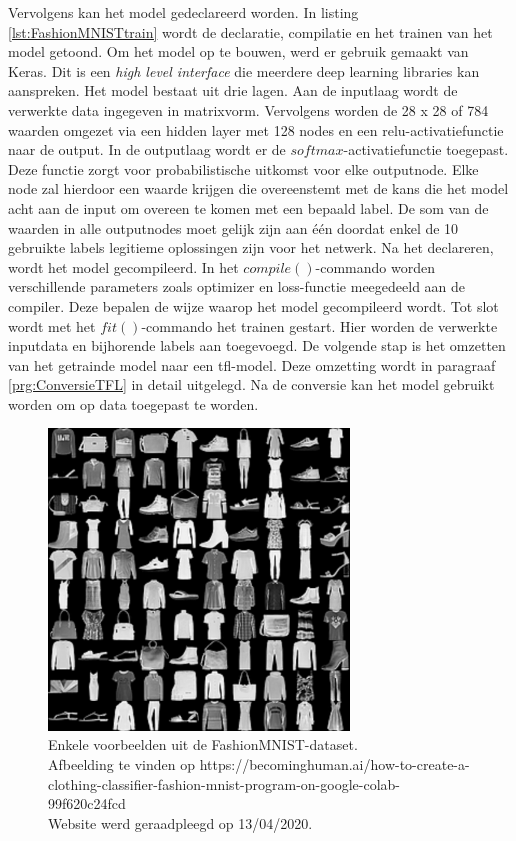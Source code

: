 			Vervolgens kan het model gedeclareerd worden. In listing \ref{lst:FashionMNISTtrain} wordt de declaratie, compilatie en het trainen van het model getoond. Om het model op te bouwen, werd er gebruik gemaakt van Keras. Dit is een \textit{high level interface} die meerdere deep learning libraries kan aanspreken. Het model bestaat uit drie lagen. Aan de inputlaag wordt de verwerkte data ingegeven in matrixvorm. Vervolgens worden de 28 x 28 of 784 waarden omgezet via een hidden layer met 128 nodes en een relu-activatiefunctie naar de output. In de outputlaag wordt er de $softmax$-activatiefunctie toegepast. Deze functie zorgt voor probabilistische uitkomst voor elke outputnode. Elke node zal hierdoor een waarde krijgen die overeenstemt met de kans die het model acht aan de input om overeen te komen met een bepaald label. De som van de waarden in alle outputnodes moet gelijk zijn aan \'e\'en doordat enkel de 10 gebruikte labels legitieme oplossingen zijn voor het netwerk. Na het declareren, wordt het model gecompileerd. In het $compile()$-commando worden verschillende parameters zoals optimizer en loss-functie meegedeeld aan de compiler. Deze bepalen de wijze waarop het model gecompileerd wordt. Tot slot wordt met het $fit()$-commando het trainen gestart. Hier worden de verwerkte inputdata en bijhorende labels aan toegevoegd. De volgende stap is het omzetten van het getrainde model naar een \gls{tfl}-model. Deze omzetting wordt in paragraaf \ref{prg:ConversieTFL} in detail uitgelegd. Na de conversie kan het model gebruikt worden om op data toegepast te worden. 
			
			
			\begin{figure}
				\centering
				\includegraphics[width=80mm]{afbeeldingen/FashionMNIST_kledij.PNG}
				\caption{Enkele voorbeelden uit de FashionMNIST-dataset. \\Afbeelding te vinden op https://becominghuman.ai/how-to-create-a-clothing-classifier-fashion-mnist-program-on-google-colab-99f620c24fcd\\ Website werd geraadpleegd op 13/04/2020.}
				\label{fig:FashionMNIST-kledij}
			\end{figure}

